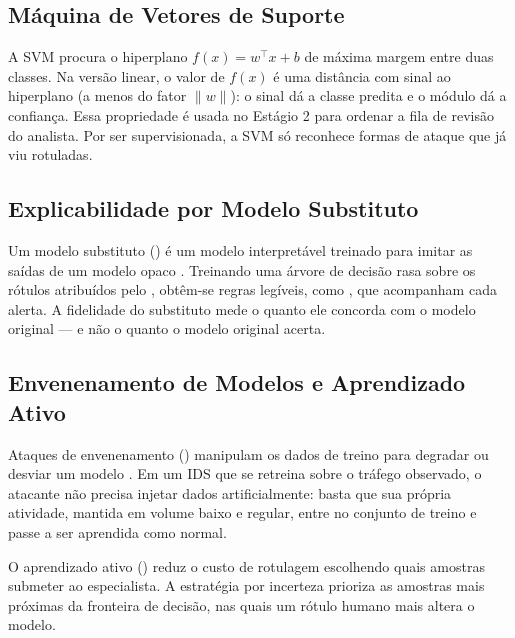 \subsection{Máquina de Vetores de Suporte}
A SVM \cite{Cortes1995Support} procura o hiperplano $f(x)=w^\top x + b$ de
máxima margem entre duas classes. Na versão linear, o valor de $f(x)$ é uma
distância com sinal ao hiperplano (a menos do fator $\lVert w\rVert$): o sinal
dá a classe predita e o módulo dá a confiança. Essa propriedade é usada no
Estágio 2 para ordenar a fila de revisão do analista. Por ser supervisionada, a
SVM só reconhece formas de ataque que já viu rotuladas.

\subsection{Explicabilidade por Modelo Substituto}
Um modelo substituto () é um modelo interpretável treinado para
imitar as saídas de um modelo opaco \cite{Craven1996Extracting}. Treinando uma
árvore de decisão rasa sobre os rótulos atribuídos pelo ,
obtêm-se regras legíveis, como , que
acompanham cada alerta. A fidelidade do substituto mede o quanto ele concorda com
o modelo original --- e não o quanto o modelo original acerta.

\subsection{Envenenamento de Modelos e Aprendizado Ativo}
Ataques de envenenamento () manipulam os dados de treino para
degradar ou desviar um modelo \cite{Biggio2012Poisoning}. Em um IDS que se
retreina sobre o tráfego observado, o atacante não precisa injetar dados
artificialmente: basta que sua própria atividade, mantida em volume baixo e
regular, entre no conjunto de treino e passe a ser aprendida como normal.

O aprendizado ativo () \cite{Settles2009Active} reduz o custo
de rotulagem escolhendo quais amostras submeter ao especialista. A estratégia por
incerteza prioriza as amostras mais próximas da fronteira de decisão, nas quais um
rótulo humano mais altera o modelo.
